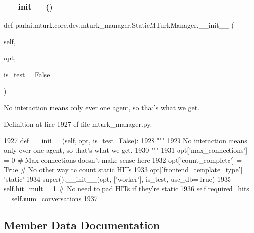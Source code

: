 \subsubsection{\texorpdfstring{\+\_\+\+\_\+init\+\_\+\+\_\+()}{\_\_init\_\_()}}
{\footnotesize\ttfamily def parlai.\+mturk.\+core.\+dev.\+mturk\+\_\+manager.\+Static\+M\+Turk\+Manager.\+\_\+\+\_\+init\+\_\+\+\_\+ (\begin{DoxyParamCaption}\item[{}]{self,  }\item[{}]{opt,  }\item[{}]{is\+\_\+test = {\ttfamily False} }\end{DoxyParamCaption})}

\begin{DoxyVerb}No interaction means only ever one agent, so that's what we get.
\end{DoxyVerb}
 

Definition at line 1927 of file mturk\+\_\+manager.\+py.


\begin{DoxyCode}
1927     \textcolor{keyword}{def }\_\_init\_\_(self, opt, is\_test=False):
1928         \textcolor{stringliteral}{"""}
1929 \textcolor{stringliteral}{        No interaction means only ever one agent, so that's what we get.}
1930 \textcolor{stringliteral}{        """}
1931         opt[\textcolor{stringliteral}{'max\_connections'}] = 0  \textcolor{comment}{# Max connections doesn't make sense here}
1932         opt[\textcolor{stringliteral}{'count\_complete'}] = \textcolor{keyword}{True}  \textcolor{comment}{# No other way to count static HITs}
1933         opt[\textcolor{stringliteral}{'frontend\_template\_type'}] = \textcolor{stringliteral}{'static'}
1934         super().\_\_init\_\_(opt, [\textcolor{stringliteral}{'worker'}], is\_test, use\_db=\textcolor{keyword}{True})
1935         self.hit\_mult = 1  \textcolor{comment}{# No need to pad HITs if they're static}
1936         self.required\_hits = self.num\_conversations
1937 
\end{DoxyCode}


\subsection{Member Data Documentation}
\mbox{\label{classparlai_1_1mturk_1_1core_1_1dev_1_1mturk__manager_1_1StaticMTurkManager_a060777f184a4d4d5927e2172cacb0cca}} 
